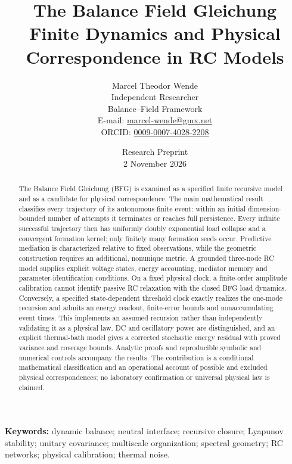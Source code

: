 \documentclass[11pt,letterpaper]{article}
\title{The Balance Field Gleichung\\Finite Dynamics and Physical Correspondence in RC Models}
\author{Marcel Theodor Wende\\\small Independent Researcher\\\small Balance--Field Framework\\\small E-mail: \href{mailto:marcel-wende@gmx.net}{marcel-wende@gmx.net}\\\small ORCID: \href{https://orcid.org/0009-0007-4028-2208}{0009-0007-4028-2208}}
\date{Research Preprint\\2 November 2026}
\theoremstyle{definition}
\numberwithin{equation}{section}
\begin{document}
\maketitle
\begin{abstract}
The Balance Field Gleichung (BFG) is examined as a specified finite recursive model and as a candidate for physical correspondence. The main mathematical result classifies every trajectory of its autonomous finite event: within an initial dimension-bounded number of attempts it terminates or reaches full persistence. Every infinite successful trajectory then has uniformly doubly exponential load collapse and a convergent formation kernel; only finitely many formation seeds occur. Predictive mediation is characterized relative to fixed observations, while the geometric construction requires an additional, nonunique metric. A grounded three-node RC model supplies explicit voltage states, energy accounting, mediator memory and parameter-identification conditions. On a fixed physical clock, a finite-order amplitude calibration cannot identify passive RC relaxation with the closed BFG load dynamics. Conversely, a specified state-dependent threshold clock exactly realizes the one-mode recursion and admits an energy readout, finite-error bounds and nonaccumulating event times. This implements an assumed recursion rather than independently validating it as a physical law. DC and oscillatory power are distinguished, and an explicit thermal-bath model gives a corrected stochastic energy residual with proved variance and coverage bounds. Analytic proofs and reproducible symbolic and numerical controls accompany the results. The contribution is a conditional mathematical classification and an operational account of possible and excluded physical correspondences; no laboratory confirmation or universal physical law is claimed.
\end{abstract}
\textbf{Keywords:} dynamic balance; neutral interface; recursive closure; Lyapunov stability; unitary covariance; multiscale organization; spectral geometry; RC networks; physical calibration; thermal noise.
\end{document}
